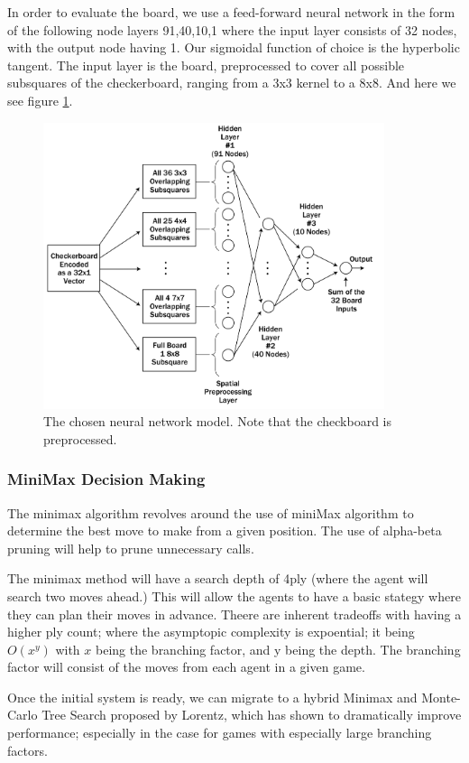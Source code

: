 \documentclass[12pt,a4paper]{article}
\begin{document}
In order to evaluate the board, we use a feed-forward neural network in the form of the following node layers {91,40,10,1} where the input layer consists of 32 nodes, with the output node having 1. Our sigmoidal function of choice is the hyperbolic tangent. The input layer is the board, preprocessed to cover all possible subsquares of the checkerboard, ranging from a 3x3 kernel to a 8x8. And here we see figure \ref{overflow}.

\begin{figure}[ht!]
    \centering
    \includegraphics[width=100mm]{nnmodel.png}
    \caption{The chosen neural network model. Note that the checkboard is preprocessed. \label{overflow}}
\end{figure}

\subsubsection{MiniMax Decision Making}

The minimax algorithm revolves around the use of miniMax algorithm to determine the best move to make from a given position. The use of alpha-beta pruning will help to prune unnecessary calls.

The minimax method will have a search depth of 4ply (where the agent will search two moves ahead.) This will allow the agents to have a basic stategy where they can plan their moves in advance. Theere are inherent tradeoffs with having a higher ply count; where the asymptopic complexity is expoential; it being $O(x^y)$ with $x$ being the branching factor, and y being the depth. The branching factor will consist of the moves from each agent in a given game.

Once the initial system is ready, we can migrate to a hybrid Minimax and  Monte-Carlo Tree Search proposed by Lorentz, which has shown to dramatically improve performance; especially in the case for games with especially large branching factors.
\end{document}
